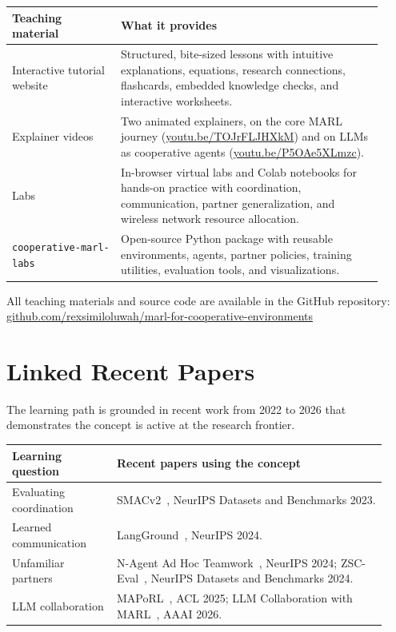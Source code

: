 \documentclass{article}
\renewcommand{\arraystretch}{0.95}
\begin{document}
\begin{center}
\footnotesize
\setlength{\tabcolsep}{5pt}
\renewcommand{\arraystretch}{1.15}
\begin{tabular}{p{0.27\linewidth}p{0.655\linewidth}}
\toprule
\textbf{Teaching material} & \textbf{What it provides}\\
\midrule
Interactive tutorial website & Structured, bite-sized lessons with intuitive explanations, equations, research connections, flashcards, embedded knowledge checks, and interactive worksheets.\\
Explainer videos & Two animated explainers, on the core MARL journey (\href{https://youtu.be/TOJrFLJHXkM}{youtu.be/TOJrFLJHXkM}) and on LLMs as cooperative agents (\href{https://youtu.be/P5OAe5XLmzc}{youtu.be/P5OAe5XLmzc}).\\
Labs & In-browser virtual labs and Colab notebooks for hands-on practice with coordination, communication, partner generalization, and wireless network resource allocation.\\
\texttt{cooperative-marl-labs} & Open-source Python package with reusable environments, agents, partner policies, training utilities, evaluation tools, and visualizations.\\
\bottomrule
\end{tabular}
\end{center}

{\raggedright\noindent All teaching materials and source code are available in
the GitHub repository:
\href{https://github.com/rexsimiloluwah/marl-for-cooperative-environments}%
{github.com/rexsimiloluwah/marl-for-cooperative-environments}\par}


\vspace{-4pt}\section{Linked Recent Papers}

The learning path is grounded in recent work from 2022 to 2026 that
demonstrates the concept is active at the research frontier.

\begin{center}
\scriptsize
\setlength{\tabcolsep}{4pt}
\begin{tabular}{p{0.26\linewidth}p{0.67\linewidth}}
\toprule
\textbf{Learning question} & \textbf{Recent papers using the concept}\\
\midrule
Evaluating coordination & SMACv2~\cite{smacv2}, NeurIPS Datasets and Benchmarks 2023.\\
Learned communication & LangGround~\cite{langground}, NeurIPS 2024.\\
Unfamiliar partners & N-Agent Ad Hoc Teamwork~\cite{naht}, NeurIPS 2024; ZSC-Eval~\cite{zsceval}, NeurIPS Datasets and Benchmarks 2024.\\
LLM collaboration & MAPoRL~\cite{maporl}, ACL 2025; LLM Collaboration with MARL~\cite{llmcollab}, AAAI 2026.\\
\bottomrule
\end{tabular}
\end{center}
\end{document}
